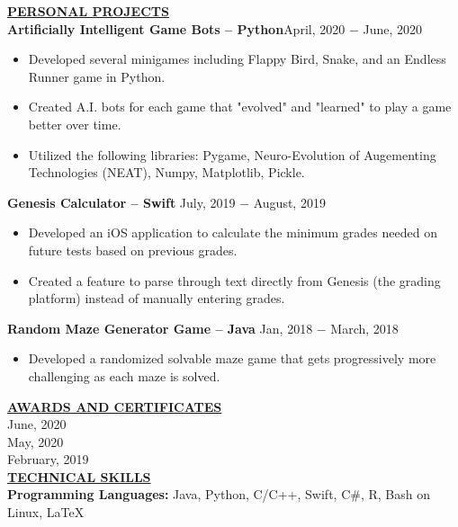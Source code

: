 \documentclass{article}
\begin{document}
\noindent \textbf{\underline{PERSONAL PROJECTS}} \\
\noindent \textbf{Artificially Intelligent Game Bots -- Python}\hfill  April, 2020 $-$ June, 2020
\begin{itemize}[noitemsep,nolistsep,leftmargin=*]
\item {Developed several minigames including Flappy Bird, Snake, and an Endless Runner game in Python.}
\item {Created A.I. bots for each game that "evolved" and "learned" to play a game better over time.}
\item {Utilized the following libraries: Pygame, Neuro-Evolution of Augementing Technologies (NEAT), Numpy, Matplotlib, Pickle.}\\
\end{itemize}

\noindent \textbf{Genesis Calculator -- Swift} \hfill  July, 2019 $-$ August, 2019
\begin{itemize}[noitemsep,nolistsep,leftmargin=*]
\item {Developed an iOS application to calculate the minimum grades needed on future tests based on previous grades.}
\item {Created a feature to parse through text directly from Genesis (the grading platform) instead of manually entering grades.}\\
\end{itemize}

\noindent \textbf{Random Maze Generator Game -- Java} \hfill  Jan, 2018 $-$ March, 2018
\begin{itemize}[noitemsep,nolistsep,leftmargin=*]
\item {Developed a randomized solvable maze game that gets progressively more challenging as each maze is solved.}\\
\end{itemize}




\noindent \textbf{\underline{AWARDS AND CERTIFICATES}} \\
 \hfill June, 2020 \\
 \hfill May, 2020 \\
 \hfill February, 2019 \\



\noindent \textbf{\underline{TECHNICAL SKILLS}} \\
\noindent \textbf{Programming Languages:} Java, Python, C/C++, Swift, C\#, R, Bash on Linux, LaTeX\\
\end{document}
